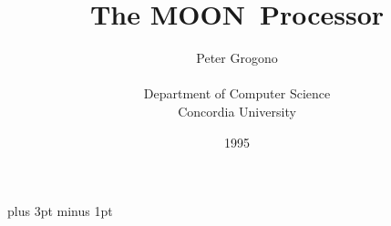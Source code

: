 

\textwidth     6.5in
\textheight      9in
\topmargin    -0.5in
\oddsidemargin   0in
\evensidemargin  0in
\parskip         5pt plus 3pt minus 1pt
\parindent       0pt

\newcommand{\luna}{{\sf LUNA}}
\newcommand{\moon}{{\sf MOON}}
\newcommand{\sun }{{\sf SUN }}

\newcommand{\xf}[1]{Figure~\ref{#1}}
\newcommand{\xs}[1]{Section~\ref{#1}}
\newcommand{\id}[1]{\mbox{\it #1\/}}
\newcommand{\kw}[1]{\mbox{\sf #1}}
\newcommand{\qt}[1]{``{\tt #1}''}
\newcommand{\cmt}{{\rm \%}}
\newcommand{\usc}{\underline{\hskip 1em}}
\newcommand{\bt}{$\bullet$}
\newcommand{\lr}{\mbox{$\longrightarrow$}}
\newcommand{\code}[1]{\langle#1\rangle}


\setcounter{secnumdepth}{3}

\newenvironment{prog}{\par\def\-{\qquad}\vspace{\parskip}%
\parskip0pt\leftskip2em\obeylines}{}

\newcommand{\bmem}[1]{{\cal M}_8[#1]}
\newcommand{\wmem}[1]{{\cal M}_{32}[#1]}
\newcommand{\breg}[2]{{\cal R}_{#1}(#2)}
\newcommand{\wreg}[1]{{\cal R}(#1)}
\newcommand{\ic}{\mbox{\it PC\/}}
\newcommand{\ass}[1]{\stackrel{#1}{\longleftarrow}}
\newcommand{\nont}[1]{\mbox{\sl #1\/}}
\newcommand{\ang}[1]{\langle\mbox{\it #1\/}\rangle}

\newenvironment{nolab}%
{\begin{list}{}{\topsep 0pt plus 3pt \labelsep 0.5em%
\leftmargin 2em \parsep0.5ex \itemsep 0ex}}%
{\end{list}}

\author{Peter Grogono \\ \\
Department of Computer Science\\
Concordia University}
\title{The \moon\ Processor}
\date{1995}
\pagestyle{headings}

\maketitle


